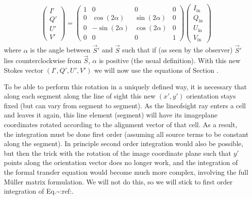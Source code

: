 \documentclass[letterpaper,10pt,english]{sphinxmanual}
\begin{document}
\label{\detokenize{dustradtrans:eq-rot-stokes-align}}\begin{equation*}
\begin{split}\left(\begin{matrix}
I'\\Q'\\U'\\V'
\end{matrix}\right)
=
\left(\begin{matrix}
1 & 0 & 0 & 0 \\
0 & \cos(2\alpha) & \sin(2\alpha) & 0 \\
0 & -\sin(2\alpha) & \cos(2\alpha) & 0 \\
0 & 0 & 0 & 1
\end{matrix}\right)
\left(\begin{matrix}
I_{\mathrm{in}}\\Q_{\mathrm{in}}\\U_{\mathrm{in}}\\V_{\mathrm{in}}
\end{matrix}\right)\end{split}
\end{equation*}
where \(\alpha\) is the angle between \(\vec S'\) and \(\vec S\)
such that if (as seen by the observer) \(\vec S'\) lies counter\sphinxhyphen{}clockwise
from \(\vec S\), \(\alpha\) is positive (the usual definition). With
this new Stokes vector \((I',Q',U',V')\) we will now use the equations of
Section {\hyperref[\detokenize{dustradtrans:sec-basic-equations}]{}}.

To be able to perform this rotation in a uniquely defined way, it is necessary
that along each segment along the line of sight this new \((x',y')\)
orientation stays fixed (but can vary from segment to segment). As the
line\sphinxhyphen{}of\sphinxhyphen{}sight ray enters a cell and leaves it again, this line element (segment)
will have its image\sphinxhyphen{}plane coordinates rotated according to the alignment vector
of that cell. As a result, the integration must be done first order (assuming
all source terms to be constant along the segment).  In principle second order
integration would also be possible, but then the trick with the rotation of the
image coordinate plane such that \(y'\) points along the orientation vector
does no longer work, and the integration of the formal transfer equation would
become much more complex, involving the full Müller matrix formulation. We will
not do this, so we will stick to first order integration of
Eq.\textasciitilde{}:ref:.
\end{document}
